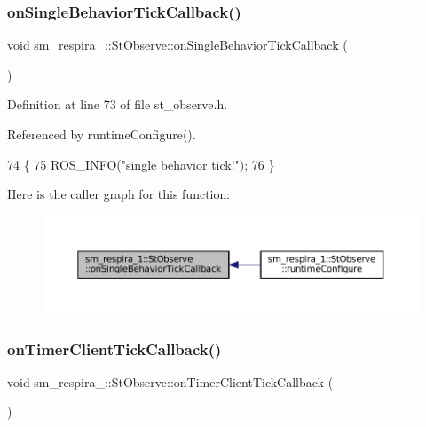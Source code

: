\subsubsection{\texorpdfstring{on\+Single\+Behavior\+Tick\+Callback()}{onSingleBehaviorTickCallback()}}
{\footnotesize\ttfamily void sm\+\_\+respira\+\_\+::\+St\+Observe\+::on\+Single\+Behavior\+Tick\+Callback (\begin{DoxyParamCaption}{ }\end{DoxyParamCaption})\hspace{0.3cm}{\ttfamily [inline]}}



Definition at line 73 of file st\+\_\+observe.\+h.



Referenced by runtime\+Configure().


\begin{DoxyCode}
74     \{
75         ROS\_INFO(\textcolor{stringliteral}{"single behavior tick!"});
76     \}
\end{DoxyCode}
Here is the caller graph for this function\+:
\nopagebreak
\begin{figure}[H]
\begin{center}
\leavevmode
\includegraphics[width=350pt]{structsm__respira__1_1_1StObserve_abe113ea6ed3da4ae0d97830bc7dae030_icgraph}
\end{center}
\end{figure}
\mbox{\label{structsm__respira__1_1_1StObserve_a83c485ad4ae46796d84eb04ddabd97a2}} 
\subsubsection{\texorpdfstring{on\+Timer\+Client\+Tick\+Callback()}{onTimerClientTickCallback()}}
{\footnotesize\ttfamily void sm\+\_\+respira\+\_\+::\+St\+Observe\+::on\+Timer\+Client\+Tick\+Callback (\begin{DoxyParamCaption}{ }\end{DoxyParamCaption})\hspace{0.3cm}{\ttfamily [inline]}}




